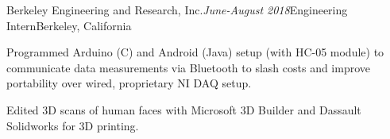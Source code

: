 \begin{rSubsection}{Berkeley Engineering and Research, Inc.}{\em June-August 2018}{Engineering Intern}{Berkeley, California}

\item Programmed Arduino (C) and Android (Java) setup (with HC-05 module) to communicate data measurements via Bluetooth to slash costs and improve portability over wired, proprietary NI DAQ setup.
\item Edited 3D scans of human faces with Microsoft 3D Builder and Dassault Solidworks for 3D printing.
\end{rSubsection}